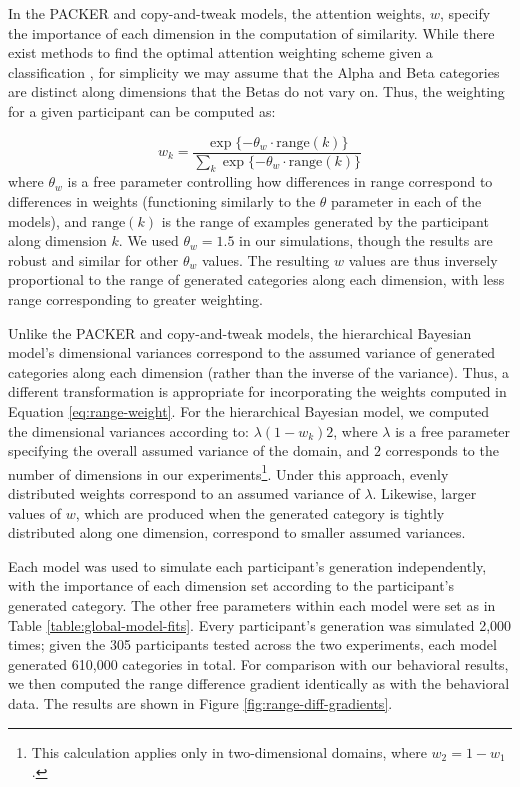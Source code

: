 \documentclass[12pt]{article}
\begin{document}
\begin{flushleft}
In the PACKER and copy-and-tweak models, the attention weights, $w$, specify the importance of each dimension in the computation of similarity. While there exist methods to find the optimal attention weighting scheme given a classification \citep[see][]{vanpaemel2012using}, for simplicity we may assume that the Alpha and Beta categories are distinct along dimensions that the Betas do not vary on. Thus, the weighting for a given participant can be computed as:

\begin{equation}
w_k = \dfrac
{\exp{ \{ -\theta_w \cdot\text{range}(k)}  \} } 
{ \sum_k {\exp{ \{ -\theta_w \cdot\text{range}(k)}  \} } }
\label{eq:range-weight}
\end{equation}
% 
where $\theta_w$ is a free parameter controlling how differences in range correspond to differences in weights (functioning similarly to the $\theta$ parameter in each of the models), and $\text{range}(k)$ is the range of examples generated by the participant along dimension $k$. We used $\theta_w = 1.5$ in our simulations, though the results are robust and similar for other $\theta_w$ values. The resulting $w$ values are thus inversely proportional to the range of generated categories along each dimension, with less range corresponding to greater weighting.

Unlike the PACKER and copy-and-tweak models, the hierarchical Bayesian model's dimensional variances correspond to the assumed variance of generated categories along each dimension (rather than the inverse of the variance). Thus, a different transformation is appropriate for incorporating the weights computed in Equation \ref{eq:range-weight}. For the hierarchical Bayesian model, we computed the dimensional variances according to: $\lambda (1-w_k) 2$, where $\lambda$ is a free parameter specifying the overall assumed variance of the domain, and $2$ corresponds to the number of dimensions in our experiments\footnote{This calculation applies only in two-dimensional domains, where $w_2 = 1-w_1$.}. Under this approach, evenly distributed weights correspond to an assumed variance of $\lambda$. Likewise, larger values of $w$, which are produced when the generated category is tightly distributed along one dimension, correspond to smaller assumed variances. 

Each model was used to simulate each participant's generation independently, with the importance of each dimension set according to the participant's generated category. The other free parameters within each model were set as in Table \ref{table:global-model-fits}. Every participant's generation was simulated 2,000 times; given the 305 participants tested across the two experiments, each model generated 610,000 categories in total. For comparison with our behavioral results, we then computed the range difference gradient identically as with the behavioral data. The results are shown in Figure \ref{fig:range-diff-gradients}.


\end{flushleft}
\end{document}

